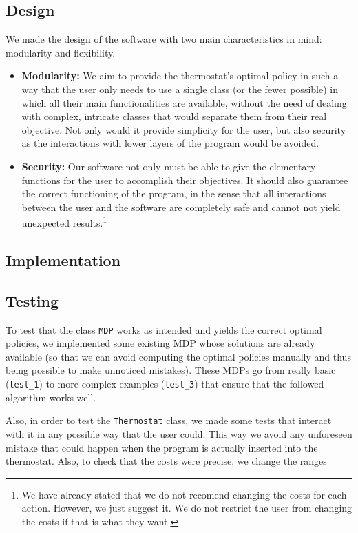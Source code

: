 \documentclass[12pt]{article}
\begin{document}
\subsection{Design}
\label{sec:org903f999}
We made the design of the software with two main characteristics in mind: modularity and flexibility.
\begin{itemize}
\item \textbf{Modularity:} We aim to provide the thermostat's optimal policy in such a way that the user only needs to use a single class (or the fewer possible) in which all their main functionalities are available, without the need of dealing with complex, intricate classes that would separate them from their real objective. Not only would it provide simplicity for the user, but also security as the interactions with lower layers of the program would be avoided.
\item \textbf{Security:} Our software not only must be able to give the elementary functions for the user to accomplish their objectives. It should also guarantee the correct functioning of the program, in the sense that all interactions between the user and the software are completely safe and cannot not yield unexpected results.\footnote{We have already stated that we do not recomend changing the costs for each action. However, we just suggest it. We do not restrict the user from changing the costs if that is what they want.}
\end{itemize}

\subsection{Implementation}
\label{sec:org5f80aa1}

\subsection{Testing}
\label{sec:org1a001a5}
To test that the class \texttt{MDP} works as intended and yields the correct optimal policies, we implemented some existing MDP whose solutions are already available (so that we can avoid computing the optimal policies manually and thus being possible to make unnoticed mistakes). These MDPs go from really basic (\texttt{test\_1}) to more complex examples (\texttt{test\_3}) that ensure that the followed algorithm works well.

Also, in order to test the \texttt{Thermostat} class, we made some tests that interact with it in any possible way that the user could. This way we avoid any unforeseen mistake that could happen when the program is actually inserted into the thermostat. \sout{Also, to check that the costs were precise, we change the ranges}
\newpage
\end{document}
